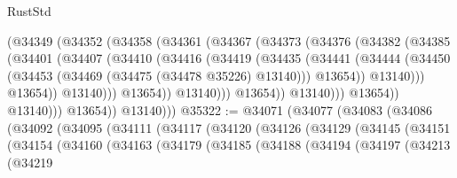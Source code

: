 \begin{lexlean}{RustStd}
\begin{coremodule}
                            (@34349
                              (@34352
                                (@34358
                                  (@34361
                                    (@34367
                                      (@34373
                                        (@34376
                                          (@34382
                                            (@34385
                                              (@34401
                                                (@34407
                                                  (@34410
                                                    (@34416
                                                      (@34419
                                                        (@34435
                                                          (@34441
                                                            (@34444
                                                              (@34450
                                                                (@34453
                                                                  (@34469
                                                                    (@34475
                                                                      (@34478 @35226)
                                                                      @13140)))
                                                                @13654))
                                                            @13140)))
                                                      @13654))
                                                  @13140)))
                                            @13654))
                                        @13140)))
                                  @13654))
                              @13140)))
                        @13654))
                    @13140)))
              @13654))
          @13140)))
@35322 := @34071
    (@34077
      (@34083
        (@34086
          (@34092
            (@34095
              (@34111
                (@34117
                  (@34120
                    (@34126
                      (@34129
                        (@34145
                          (@34151
                            (@34154
                              (@34160
                                (@34163
                                  (@34179
                                    (@34185
                                      (@34188
                                        (@34194
                                          (@34197
                                            (@34213
                                              (@34219

\end{coremodule}
\end{lexlean}
